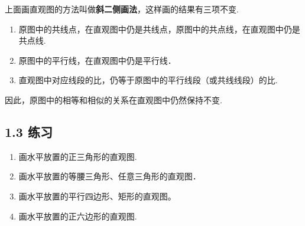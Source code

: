 上面画直观图的方法叫做\textbf{斜二侧画法}，这样画的结果有三项不变.
\begin{enumerate}
\item 原图中的共线点，在直观图中仍是共线点，原图中的共点线，在直观图中仍是共点线.
\item 原图中的平行线，在直观图中仍是平行线．
\item 直观图中对应线段的比，仍等于原图中的平行线段（或共线线段）的比.
\end{enumerate}

因此，原图中的相等和相似的关系在直观图中仍然保持不变.


\subsection*{1.3 练习}
\begin{enumerate}
\item 画水平放置的正三角形的直观图. 
\item 画水平放置的等腰三角形、任意三角形的直观图．
\item 画水平放置的平行四边形、矩形的直观图。
\item 画水平放置的正六边形的直观图.
\end{enumerate}

